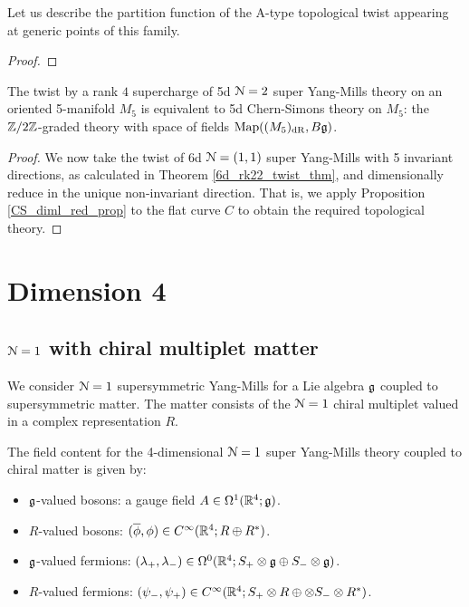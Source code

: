 \documentclass[10pt, oneside]{article}
\begin{document}
Let us describe the partition function of the A-type topological twist appearing at generic points of this family.  
\begin{theorem}
\end{theorem}

\begin{proof}
 
\end{proof}

\begin{theorem} \label{5d_rk4_twist_thm}
The twist by a rank $4$ supercharge of 5d $\mathcal{N}=2$ super Yang-Mills theory on an oriented 5-manifold $M_5$ is equivalent to 5d Chern-Simons theory on $M_5$: the $\mathbb Z/2\mathbb Z$-graded theory with space of fields $\mathrm{Map}((M_5)_{\mathrm{dR}}, B\mathfrak{g})$.
\end{theorem}

\begin{proof}
We now take the twist of 6d $\mathcal{N}=(1,1)$ super Yang-Mills with 5 invariant directions, as calculated in Theorem \ref{6d_rk22_twist_thm}, and dimensionally reduce in the unique non-invariant direction.  That is, we apply Proposition \ref{CS_diml_red_prop} to the flat curve $C$ to obtain the required topological theory.
\end{proof}
 
\section{Dimension 4}

\subsection{\texorpdfstring{$\mathcal N=1$}{N=1} with chiral multiplet matter} \label{4d_1_section}
We consider $\mathcal N=1$ supersymmetric Yang-Mills for a Lie algebra $\mathfrak g$ coupled to supersymmetric matter.
The matter consists of the $\mathcal N=1$ chiral multiplet valued in a complex representation $R$. 


The field content for the 4-dimensional $\mathcal N=1$ super Yang-Mills theory coupled to chiral matter is given by:
\begin{itemize}
\item $\mathfrak g$-valued bosons: a gauge field $A \in \Omega^1(\mathbb R^4 ; \mathfrak g)$.
\item $R$-valued bosons: $(\overline{\phi}, \phi) \in C^\infty(\mathbb R^4 ; R \oplus R^*)$.
\item $\mathfrak g$-valued fermions: $(\lambda_+, \lambda_-) \in \Omega^0(\mathbb R^4 ; S_+ \otimes \mathfrak g \oplus S_- \otimes \mathfrak g)$.
\item $R$-valued fermions: $(\psi_-,\psi_+) \in C^\infty(\mathbb R^4 ; S_+ \otimes R \oplus \otimes S_- \otimes R^*)$.
\end{itemize}
\end{document}

